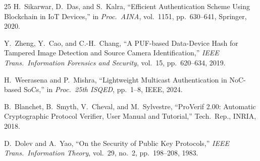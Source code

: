 \documentclass[conference]{IEEEtran}
\begin{document}
\begin{thebibliography}{25}
H.~Sikarwar, D.~Das, and S.~Kalra,
``Efficient Authentication Scheme Using Blockchain in IoT Devices,''
in \emph{Proc.\ AINA}, vol.~1151, pp.~630--641, Springer, 2020.

Y.~Zheng, Y.~Cao, and C.-H.~Chang,
``A PUF-based Data-Device Hash for Tampered Image Detection and Source Camera
Identification,''
\emph{IEEE Trans.\ Information Forensics and Security}, vol.~15,
pp.~620--634, 2019.

H.~Weerasena and P.~Mishra,
``Lightweight Multicast Authentication in NoC-based SoCs,''
in \emph{Proc.\ 25th ISQED}, pp.~1--8, IEEE, 2024.

B.~Blanchet, B.~Smyth, V.~Cheval, and M.~Sylvestre,
``ProVerif 2.00: Automatic Cryptographic Protocol Verifier, User Manual and
Tutorial,''
Tech.\ Rep., INRIA, 2018.

D.~Dolev and A.~Yao,
``On the Security of Public Key Protocols,''
\emph{IEEE Trans.\ Information Theory}, vol.~29, no.~2, pp.~198--208, 1983.

\end{thebibliography}
\end{document}
